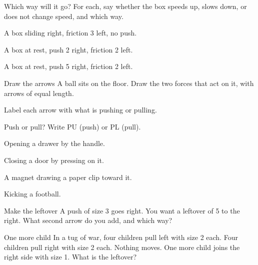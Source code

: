 \begin{puzzle}{Which way will it go?}
For each, say whether the box speeds up, slows down, or does not change speed, and which way.
\begin{description}[leftmargin=1.6em,itemsep=0.3em,style=sameline]
\item[(a)] A box sliding right, friction 3 left, no push. \wline[4cm]
\item[(b)] A box at rest, push 2 right, friction 2 left. \wline[4cm]
\item[(c)] A box at rest, push 5 right, friction 2 left. \wline[4cm]
\end{description}
\end{puzzle}

\begin{puzzle}{Draw the arrows}
A ball sits on the floor. Draw the two forces that act on it, with arrows of equal length.
\begin{center}
\end{center}
Label each arrow with what is pushing or pulling. \wline[4cm]
\end{puzzle}

\begin{puzzle}{Push or pull?}
Write PU (push) or PL (pull).
\begin{description}[leftmargin=1.6em,itemsep=0.3em,style=sameline]
\item[(a)] Opening a drawer by the handle. \wline[1cm]
\item[(b)] Closing a door by pressing on it. \wline[1cm]
\item[(c)] A magnet drawing a paper clip toward it. \wline[1cm]
\item[(d)] Kicking a football. \wline[1cm]
\end{description}
\end{puzzle}
\clearpage

\begin{puzzle}{Make the leftover}
A push of size 3 goes right. You want a leftover of 5 to the right. What second arrow do you add, and which way? \wline[4cm]
\end{puzzle}

\begin{puzzle}{One more child}
In a tug of war, four children pull left with size 2 each. Four children pull right with size 2 each. Nothing moves. One more child joins the right side with size 1. What is the leftover? \wline[3cm]
\end{puzzle}

